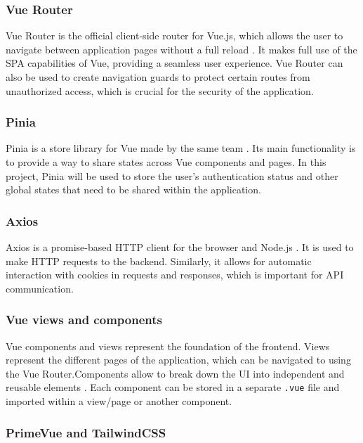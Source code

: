 \FloatBarrier{}
\subsubsection{Vue Router}

Vue Router is the official client-side router for Vue.js, which allows the user to navigate between application pages without a full reload \parencite{vuerouter}. It makes full use of the SPA capabilities of Vue, providing a seamless user experience. Vue Router can also be used to create navigation guards to protect certain routes from unauthorized access, which is crucial for the security of the application.

\subsubsection{Pinia}

Pinia is a store library for Vue made by the same team \parencite{pinia}. Its main functionality is to provide a way to share states across Vue components and pages. In this project, Pinia will be used to store the user's authentication status and other global states that need to be shared within the application.

\subsubsection{Axios}

Axios is a promise-based HTTP client for the browser and Node.js \parencite{axios}. It is used to make HTTP requests to the backend. Similarly, it allows for automatic interaction with cookies in requests and responses, which is important for API communication.

\subsubsection{Vue views and components}

Vue components and views represent the foundation of the frontend. Views represent the different pages of the application, which can be navigated to using the Vue Router.Components allow to break down the UI into independent and reusable elements \parencite{vuecomponents}. Each component can be stored in a separate \lstinline{.vue} file and imported within a view/page or another component.

\subsubsection{PrimeVue and TailwindCSS}

